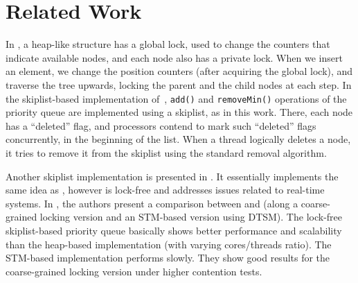 \section{Related Work}
\label{Sec-RelatedWork}

In \cite{pqhunt}, a heap-like structure has a global lock, used to change the counters that indicate available nodes, and each node also has a private lock. When we insert an element, we change the position counters (after acquiring the global lock), and traverse the tree upwards, locking the parent and the child nodes at each step.
In the skiplist-based implementation of~\cite{Lotan2000}, \texttt{add()} and \texttt{removeMin()} operations of the priority queue are implemented using a skiplist, as in this work. There, each node has a ``deleted'' flag, and processors contend to mark such ``deleted'' flags concurrently, in the beginning of the list. When a thread logically deletes a node, it tries to remove it from the skiplist using the standard removal algorithm.%

Another skiplist implementation is presented in \cite{pqsundelltsigas}. It essentially implements the same idea as \cite{Lotan2000}, however is lock-free and addresses issues related to real-time systems. %
In \cite{pqsurvey}, the authors present a comparison between \cite{pqhunt} and \cite{pqsundelltsigas} (along a coarse-grained locking version and an STM-based version using DTSM). The lock-free skiplist-based priority queue basically shows better performance and scalability than the heap-based implementation (with varying cores/threads ratio). The STM-based implementation performs slowly. They show good results for the coarse-grained locking version under higher contention tests.

